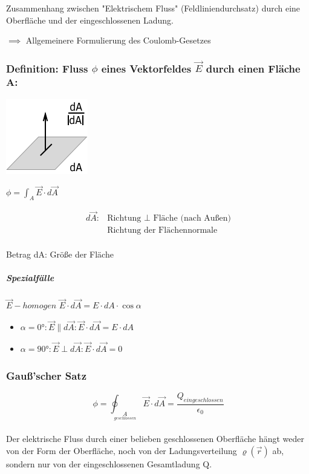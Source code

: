 \documentclass[11pt]{article}
\begin{document}
Zusammenhang zwischen "Elektrischem Fluss" (Feldliniendurchsatz) durch eine Oberfläche und der eingeschlossenen Ladung.

$\implies$ Allgemeinere Formulierung des Coulomb-Gesetzes

\subsubsection{Definition: Fluss $\phi$ eines Vektorfeldes $\vec{E}$ durch einen Fläche A:}

\includegraphics{skizzen/14/14_6B1}


$\phi= \int_A \vec{E}\cdot d\vec{A}$

\begin{align*}
	d\vec{A}:&\text{Richtung }\perp \text{ Fläche (nach Außen)}\\
	&\text{Richtung der Flächennormale}
\end{align*}\\

Betrag dA: Größe der Fläche

\subparagraph{Spezialfälle}

$\vec{E}-homogen$
$\vec{E}\cdot d\vec{A}= E\cdot dA\cdot \cos\alpha$

\begin{itemize}
	\item $\alpha=0°: \vec{E}\parallel d\vec{A}: \vec{E}\cdot d\vec{A}=E\cdot dA$\\
	\item $\alpha=90°: \vec{E}\perp d\vec{A}: \vec{E}\cdot d\vec{A}=0$
\end{itemize}

\subsubsection{Gauß'scher Satz}

$$\boxed{\displaystyle\phi=\oint_{\underset{geschlossen}{A}}\vec{E}\cdot d\vec{A}=\frac{Q_{eingeschlossen}}{\epsilon_0}}$$\\

Der elektrische Fluss durch einer belieben geschlossenen Oberfläche hängt weder von der Form der Oberfläche, noch von der Ladungsverteilung $\varrho(\vec{r})$ ab, sondern nur von der eingeschlossenen Gesamtladung Q.\\
\end{document}
